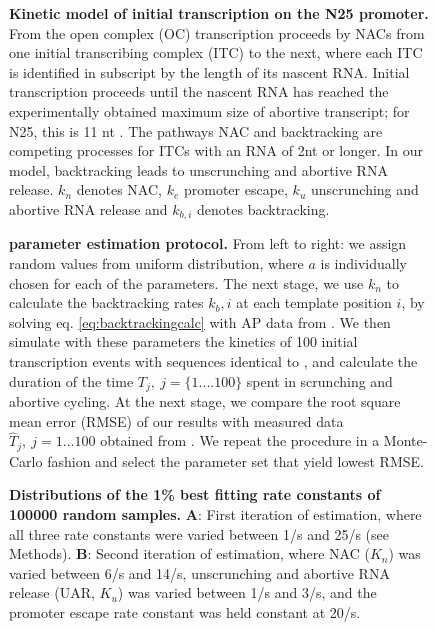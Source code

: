 \documentclass{bmcart}
\begin{document}
\begin{backmatter}
\begin{figure}[h!]
    \begin{center}
    \end{center}
  \caption{{\bf Kinetic model of initial transcription on the N25 promoter.}
    From the open complex (OC) transcription proceeds by NACs from one initial
    transcribing complex (ITC) to the next, where each ITC is identified in
    subscript by the length of its nascent RNA. Initial transcription proceeds
    until the nascent RNA has reached the experimentally obtained maximum size
    of abortive transcript; for N25, this is 11 nt \cite{hsu_initial_2006}.
    The pathways NAC and backtracking are competing processes for ITCs with an
    RNA of 2nt or longer. In our model, backtracking leads to unscrunching and
    abortive RNA release. $k_n$ denotes NAC, $k_e$ promoter escape, $k_u$
    unscrunching and abortive RNA release and $k_{b,i}$ denotes
    backtracking.}
    \label{fig:model_and_rates}
\end{figure}

\begin{figure}[h!]
    \begin{center}
    \end{center}
  \caption{ {\bf parameter estimation protocol.} From left to right: we assign
  random values from uniform distribution, where $a$ is individually chosen
  for each of the parameters. The next stage, we use $k_n$ to calculate the
  backtracking rates $k_b,i$ at each template position $i$, by solving eq.
  \ref{eq:backtrackingcalc} with AP data from \cite{hsu_initial_2006}. We then
  simulate with these parameters the kinetics of 100 initial transcription
  events with sequences identical to \cite{revyakin_abortive_2006}, and
  calculate the duration of the  time $T_j,\ j=\{1....100\}$ spent in
  scrunching and abortive cycling. At the next stage, we compare the root
  square mean error (RMSE) of our results with measured data $\hat T _j,\
  j={1...100}$ obtained from \cite{revyakin_abortive_2006}. We repeat the
  procedure in a Monte-Carlo fashion and select the parameter set that yield
  lowest RMSE.}
    \label{fig:param_estimation_scheme}
\end{figure}

\begin{figure}[h!]
\begin{center}
    \end{center}
  \caption{ {\bf Distributions of the 1\% best fitting rate constants of
      100000 random samples.} \textbf{A}: First iteration of estimation, where
      all three rate constants were varied between 1/s and 25/s (see Methods).
      \textbf{B}: Second iteration of estimation, where NAC ($K_n$) was varied
      between 6/s and 14/s, unscrunching and abortive RNA release (UAR, $K_u$)
      was varied between 1/s and 3/s, and the promoter escape rate constant
      was held constant at 20/s.}
    \label{fig:parameter_estimation_proper}
\end{figure}


\end{backmatter}
\end{document}
